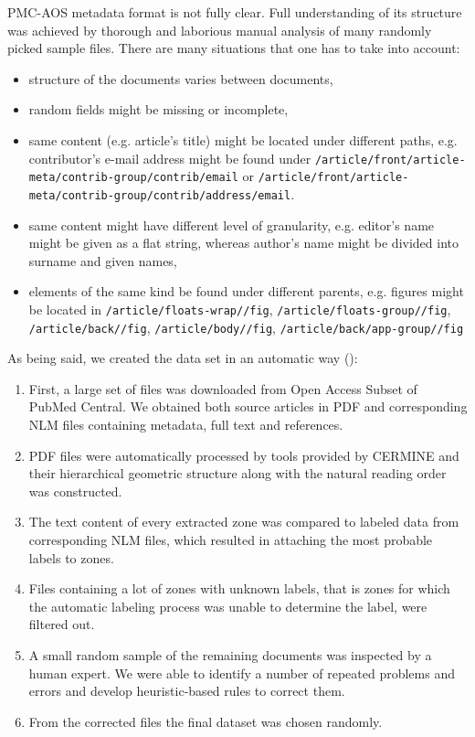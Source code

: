  PMC-AOS metadata format is not fully clear. Full understanding of its structure was achieved by thorough and laborious manual analysis of many randomly picked sample files. There are many situations that one has to take into account:
\begin{itemize}
\item structure of the documents varies between documents,
\item random fields might be missing or incomplete,
\item same content (e.g. article's title) might be located under different paths, e.g. contributor's e-mail address might be found under \verb+/article/front/article-meta/contrib-group/contrib/email+ or \verb+/article/front/article-meta/contrib-group/contrib/address/email+.
\item same content might have different level of granularity, e.g. editor's name might be given as a flat string, whereas author's name might be divided into surname and given names,
\item elements of the same kind be found under different parents, e.g. figures might be located in \verb+/article/floats-wrap//fig+, \verb+/article/floats-group//fig+, \verb+/article/back//fig+, \verb+/article/body//fig+, \verb+/article/back/app-group//fig+
\end{itemize}
As being said, we created the data set in an automatic way (\cite{DominikaTkaczykPaweSzostek2014}):
\begin{enumerate}
    \item First, a large set of files was downloaded from Open Access Subset of PubMed Central. We obtained both source articles in PDF and corresponding NLM files containing metadata, full text and references.
    \item PDF files were automatically processed by tools provided by CERMINE and their hierarchical geometric structure along with the natural reading order was constructed.
    \item The text content of every extracted zone was compared to labeled data from corresponding NLM files, which resulted in attaching the most probable labels to zones.
    \item Files containing a lot of zones with unknown labels, that is zones for which the automatic labeling process was unable to determine the label, were filtered out.
    \item A small random sample of the remaining documents was inspected by a human expert. We were able to identify a number of repeated problems and errors and develop heuristic-based rules to correct them.
    \item From the corrected files the final dataset was chosen randomly.
\end{enumerate}

